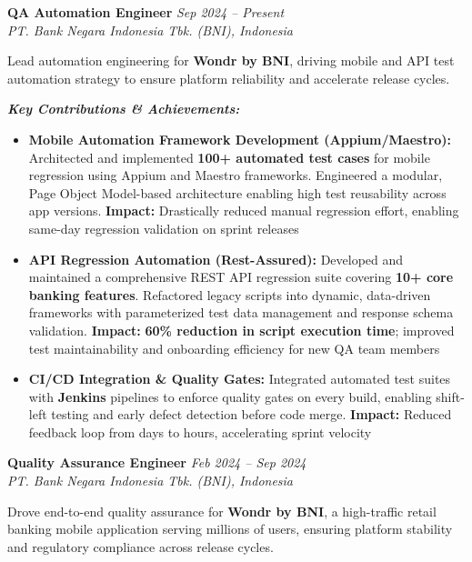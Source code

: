 \documentclass[10pt,a4paper]{article}
\newcommand{\experience}[4]{%
    \noindent\textbf{#1} \hfill \textit{#2}\\
    \textit{#3} \hfill #4\vspace{2pt}
}
\begin{document}
\experience{QA Automation Engineer}{Sep 2024 -- Present}{PT. Bank Negara Indonesia Tbk. (BNI), Indonesia}{}

Lead automation engineering for \textbf{Wondr by BNI}, driving mobile and API test automation strategy to ensure platform reliability and accelerate release cycles.

\textit{\textbf{Key Contributions \& Achievements:}}
\begin{itemize}
    \item \textbf{Mobile Automation Framework Development (Appium/Maestro):} Architected and implemented \textbf{100+ automated test cases} for mobile regression using Appium and Maestro frameworks. Engineered a modular, Page Object Model-based architecture enabling high test reusability across app versions. \textcolor{accent}{\textbf{Impact:}} Drastically reduced manual regression effort, enabling same-day regression validation on sprint releases
    \item \textbf{API Regression Automation (Rest-Assured):} Developed and maintained a comprehensive REST API regression suite covering \textbf{10+ core banking features}. Refactored legacy scripts into dynamic, data-driven frameworks with parameterized test data management and response schema validation. \textcolor{accent}{\textbf{Impact:}} \textbf{60\% reduction in script execution time}; improved test maintainability and onboarding efficiency for new QA team members
    \item \textbf{CI/CD Integration \& Quality Gates:} Integrated automated test suites with \textbf{Jenkins} pipelines to enforce quality gates on every build, enabling shift-left testing and early defect detection before code merge. \textcolor{accent}{\textbf{Impact:}} Reduced feedback loop from days to hours, accelerating sprint velocity
\end{itemize}

\vspace{4pt}

\experience{Quality Assurance Engineer}{Feb 2024 -- Sep 2024}{PT. Bank Negara Indonesia Tbk. (BNI), Indonesia}{}

Drove end-to-end quality assurance for \textbf{Wondr by BNI}, a high-traffic retail banking mobile application serving millions of users, ensuring platform stability and regulatory compliance across release cycles.
\end{document}
